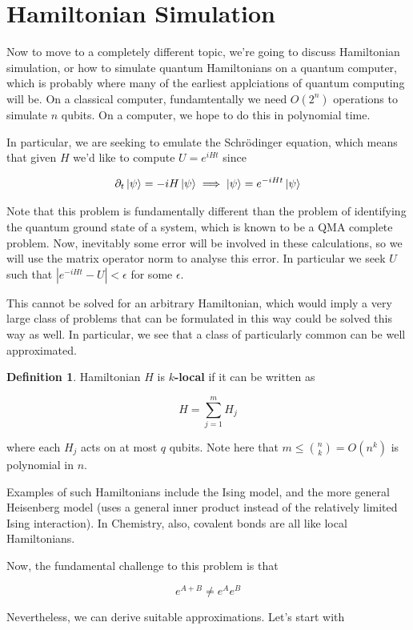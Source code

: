 \documentclass{article}
\theoremstyle{definition}
\newtheorem{definition}{Definition}
\begin{document}
\section{Hamiltonian Simulation}

Now to move to a completely different topic, we're going to discuss Hamiltonian
simulation, or how to simulate quantum Hamiltonians on a quantum computer, which
is probably where many of the earliest applciations of quantum computing will
be. On a classical computer, fundamtentally we need $O(2^n)$ operations to
simulate $n$ qubits. On a computer, we hope to do this in polynomial time.

In particular, we are seeking to emulate the Schr\"{o}dinger equation, which
means that given $H$  we'd like to compute $U = e^{i Ht}$ since

$$ \partial_t \ket{\psi} = -i H\ket{\psi} \implies \ket{\psi} = e^{-iHt}
\ket{\psi} $$

Note that this problem is fundamentally different than the problem of
identifying the quantum ground state of a system, which is known to be a QMA
complete problem. Now, inevitably some error will be involved in these
calculations, so we will use the matrix operator norm to analyse this error. In
particular we seek $U$ such that $|e^{-iHt} - U| < \epsilon$ for some
$\epsilon$.

This cannot be solved for an arbitrary Hamiltonian, which would imply a very
large class of problems that can be formulated in this way could be solved this
way as well. In particular, we see that a class of particularly common can be
well approximated.

\begin{definition}
  Hamiltonian $H$ is $k$\textbf{-local} if it can be written as

  $$ H = \sum_{j = 1}^m H_j $$

  where each $H_j$ acts on at most $q$ qubits. Note here that $m \leq
  \binom{n}{k} = O(n^k)$ is polynomial in $n$.
\end{definition}

Examples of such Hamiltonians include the Ising model, and the more general
Heisenberg model (uses a general inner product instead of the relatively limited
Ising interaction). In Chemistry, also, covalent bonds are all like local
Hamiltonians.

Now, the fundamental challenge to this problem is that

$$ e^{A + B} \neq e^A e^B $$

Nevertheless, we can derive suitable approximations. Let's start with
\end{document}
